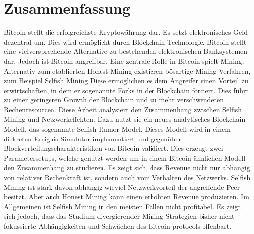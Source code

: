 \chapter*{Zusammenfassung}
Bitcoin stellt die erfolgreichste Kryptowährung dar. Es setzt elektronisches Geld dezentral um. Dies wird ermöglicht durch Blockchain Technologie. Bitcoin stellt eine vielversprechende Alternative zu bestehenden elektronischen Banksystemen dar. Jedoch ist Bitcoin angreifbar. Eine zentrale Rolle in Bitcoin spielt Mining. Alternativ zum etablierten Honest Mining existieren bösartige Mining Verfahren, zum Beispiel Selfish Mining Diese ermöglichen es dem Angreifer einen Vorteil zu erwirtschaften, in dem er sogenannte Forks in der Blockchain forciert. Dies führt zu einer geringeren Growth der Blockchain und zu mehr verschwendeten Rechenresourcen. Diese Arbeit analysiert den Zusammenhang zwischen Selfish Mining und Netzwerkeffekten. Dazu nutzt sie ein neues analytisches Blockchain Modell, das sogenannte Selfish Rumor Model. Dieses Modell wird in einem diskreten Ereignis Simulator implementiert und gegenüber Blockverteilungscharakteristiken von Bitcoin validiert. Dies erzeugt zwei Parametersetups, welche genutzt werden um in einem Bitcoin ähnlichen Modell den Zusammenhang zu studieren. Es zeigt sich, dass Revenue nicht nur abhängig von relativer Rechenkraft ist, sondern auch vom Verhalten des Netzwerks. Selfish Mining ist stark davon abhängig wieviel Netzwerkvorteil der angreifende Peer besitzt. Aber auch Honest Mining kann einen erhöhten Revenue produzieren. Im Allgemeinen ist Selfish Mining in den meisten Fällen nicht profitabel. Es zeigt sich jedoch, dass das Studium divergierender Mining Strategien bisher nicht fokussierte Abhängigkeiten und Schwächen des Bitcoin protocols offenbart.

